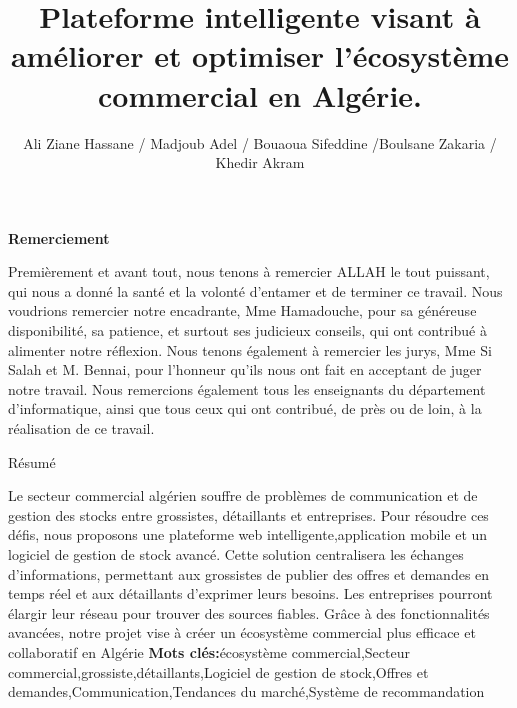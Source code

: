 \documentclass[edit,12pt,a4paper,ChapStyle,oneside,doubleinterligne]{report}
\title{Plateforme intelligente visant à améliorer et optimiser l'écosystème commercial en Algérie.}
\author{Ali Ziane Hassane / Madjoub Adel / Bouaoua Sifeddine
/Boulsane Zakaria  / Khedir Akram}
\begin{document}
\maketitle 
{}


\begin{center}
    \huge{\textbf{Remerciement}}
\end{center}
\begin{large}
    Premièrement et avant tout, nous tenons à remercier ALLAH le tout puissant, qui nous a donné la santé et la volonté d’entamer et de terminer ce travail.
\newline \newline
    Nous voudrions remercier notre encadrante, Mme Hamadouche, pour sa généreuse disponibilité, sa patience, et surtout ses judicieux conseils, qui ont contribué à alimenter notre réflexion.
 \newline \newline   
    Nous tenons également à remercier les jurys, Mme Si Salah et M. Bennai, pour l’honneur qu’ils nous ont fait en acceptant de juger notre travail.
  \newline \newline  
    Nous remercions également tous les enseignants du département d’informatique, ainsi que tous ceux qui ont contribué, de près ou de loin, à la réalisation de ce travail.
\end{large}
\newpage
\begin{center}
\huge{Résumé} 
\end{center}
\phantom{hhhh}Le secteur commercial algérien souffre de problèmes de communication et de gestion des stocks entre grossistes, détaillants et entreprises. Pour résoudre ces défis, nous proposons une plateforme web intelligente,application mobile et un logiciel de gestion de stock avancé. Cette solution centralisera les échanges d'informations, permettant aux grossistes de publier des offres et demandes en temps réel et aux détaillants d'exprimer leurs besoins. Les entreprises pourront élargir leur réseau pour trouver des sources fiables. Grâce à des fonctionnalités avancées, notre projet vise à créer un écosystème commercial plus efficace et collaboratif en Algérie
\newline\textbf{Mots clés:}écosystème commercial,Secteur commercial,grossiste,détaillants,Logiciel de gestion de stock,Offres et demandes,Communication,Tendances du marché,Système de recommandation
\end{document}
